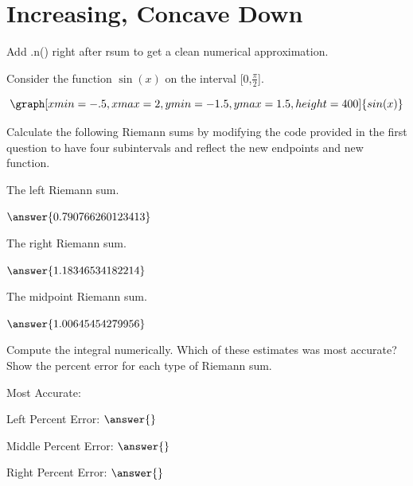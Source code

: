 \documentclass{ximera}
\begin{document}
\section{Increasing, Concave Down}
\begin{question}
\begin{hint}
Add .n() right after rsum to get a clean numerical approximation.
\end{hint}
Consider the function $\sin(x)$ on the interval [0,$\frac{\pi}{2}$].

\[
\graph[xmin=-.5,xmax=2,ymin=-1.5,ymax=1.5,height=400]{sin(x)}
\]

Calculate the following Riemann sums by modifying the code provided in the first question to have four subintervals and reflect the new endpoints and new function.

The left Riemann sum.

\begin{onlineOnly}
\begin{sageCell}

\end{sageCell}
\end{onlineOnly}

$\answer{0.790766260123413}$

The right Riemann sum.

\begin{onlineOnly}
\begin{sageCell}

\end{sageCell}
\end{onlineOnly}

$\answer{1.18346534182214}$

The midpoint Riemann sum.

\begin{onlineOnly}
\begin{sageCell}

\end{sageCell}
\end{onlineOnly}

$\answer{1.00645454279956}$

Compute the integral numerically. Which of these estimates was most accurate? Show the percent error for each type of Riemann sum.

\begin{onlineOnly}
\begin{sageCell}

\end{sageCell}
\end{onlineOnly}

Most Accurate:
\begin{multipleChoice}
\end{multipleChoice}

Left Percent Error: $\answer{}$

Middle Percent Error: $\answer{}$

Right Percent Error: $\answer{}$
\end{question}
\end{document}
